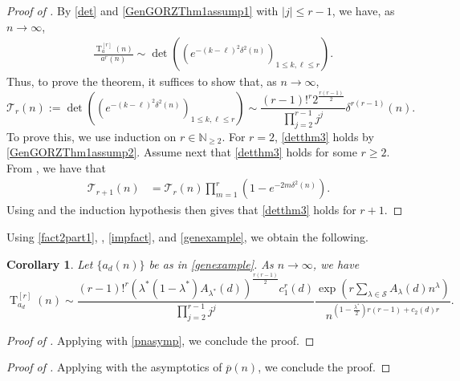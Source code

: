 \documentclass[11pt,reqno,a4paper]{amsart}
\renewcommand{\d}{{\delta}}
\renewcommand{\l}{\lambda}
\renewcommand{\(}{\left\(}
\renewcommand{\)}{\right\)}
\numberwithin{equation}{section}
\theoremstyle{plain}
\newtheorem{corollary}[theorem]{Corollary}
\theoremstyle{definition} %
\numberwithin{equation}{section}
\begin{document}
\begin{proof}[Proof of ]
	By \eqref{det} and \ref{GenGORZThm1assump1} with $|j|\le r-1$, we have, as $n\to \infty$,
	\begin{align*}%
	&\frac{\operatorname{T}^{[r]}_a(n)}{a^{r}(n)}\sim \det\left(\left(e^{-\left(k-\ell\right)^2\d^2(n)}\right)_{1\le k,\ell\le r}\right).
	\end{align*}
	Thus, to prove the theorem, it suffices to show that, as $n\to \infty$, 
	\begin{equation}\label{detthm3}
	\mathcal{T}_r(n):=\det\left(\left(e^{-\left(k-\ell\right)^2\d^2(n)}\right)_{1\le k,\ell\le r}\right)\sim \frac{(r-1)!^r2^{\frac{r(r-1)}{2}}}{\prod_{j=2}^{r-1}j^{j}}\d^{r(r-1)}(n).
	\end{equation}
	To prove this, we use induction on $r\in \mathbb{N}_{\ge 2}$. For $r=2$, \eqref{detthm3} holds by \ref{GenGORZThm1assump2}. Assume next that \eqref{detthm3} holds for some $r\ge 2$. From \cite{DP}, we have that
	\begin{align*}
	\mathcal{T}_{r+1}(n)
	&
	=\mathcal{T}_r(n)\prod_{m=1}^{r}\left(1-e^{-2m\d^2(n)}\right).
	\end{align*}
 Using  and the induction hypothesis then gives that \eqref{detthm3} holds for $r+1$.\qedhere 
\end{proof}



 Using  \ref{fact2part1}, , \eqref{impfact}, and \eqref{genexample}, we obtain the following.

\begin{corollary}\label{detmain1}
	Let $\{a_d(n)\}$ be as in \eqref{genexample}. As $n\to \infty$, we have
	\[
	\operatorname{T}^{[r]}_{a_d}(n)\sim \frac{(r-1)!^r\left(\l^*(1-\l^*)A_{\l^*}(d)\right)^{\frac{r(r-1)}{2}}c^r_1(d)}{\prod_{j=2}^{r-1}j^{j}}\frac{\exp\left(r\sum_{\l\in \mathcal{S}}A_{\l}(d)n^{\l}\right)}{n^{\left(1-\frac{\l^*}{2}\right)r(r-1)+c_2(d)r}}. 
	\]
\end{corollary}





\begin{proof}[Proof of ]
 Applying  with \eqref{pnasymp}, we conclude the proof.\qedhere 
\end{proof}



\begin{proof}[Proof of ]
 Applying  with the asymptotics of $\overline{p}(n)$, we conclude the proof. \qedhere 
\end{proof}
\end{document}
